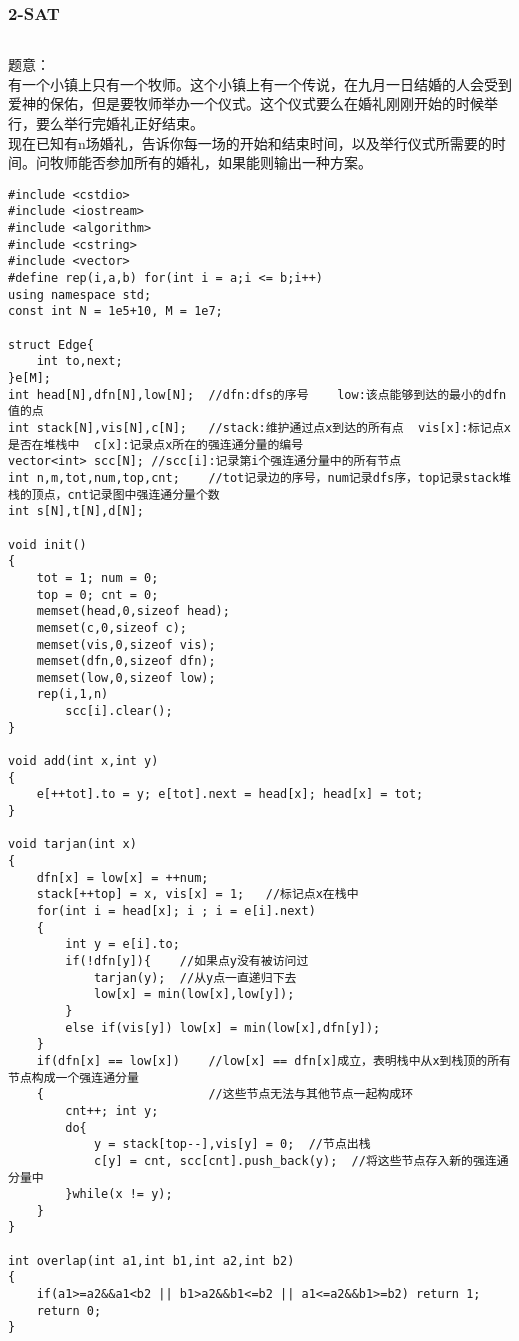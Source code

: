 \documentclass[twoside]{article}
\begin{document}
\subsubsection{2-SAT}
\begin{lstlisting}
\end{lstlisting}
题意：\\
\quad 有一个小镇上只有一个牧师。这个小镇上有一个传说，在九月一日结婚的人会受到爱神的保佑，但是要牧师举办一个仪式。这个仪式要么在婚礼刚刚开始的时候举行，要么举行完婚礼正好结束。 \\
\quad 现在已知有n场婚礼，告诉你每一场的开始和结束时间，以及举行仪式所需要的时间。问牧师能否参加所有的婚礼，如果能则输出一种方案。\\
\begin{lstlisting}
#include <cstdio>
#include <iostream>
#include <algorithm>
#include <cstring>
#include <vector>
#define rep(i,a,b) for(int i = a;i <= b;i++)
using namespace std;
const int N = 1e5+10, M = 1e7;

struct Edge{
	int to,next;
}e[M];
int head[N],dfn[N],low[N];	//dfn:dfs的序号	low:该点能够到达的最小的dfn值的点
int stack[N],vis[N],c[N];	//stack:维护通过点x到达的所有点  vis[x]:标记点x是否在堆栈中  c[x]:记录点x所在的强连通分量的编号
vector<int> scc[N];	//scc[i]:记录第i个强连通分量中的所有节点
int n,m,tot,num,top,cnt;	//tot记录边的序号，num记录dfs序，top记录stack堆栈的顶点，cnt记录图中强连通分量个数
int s[N],t[N],d[N];

void init()
{
	tot = 1; num = 0;
	top = 0; cnt = 0;
	memset(head,0,sizeof head);
	memset(c,0,sizeof c);
	memset(vis,0,sizeof vis);
	memset(dfn,0,sizeof dfn);
	memset(low,0,sizeof low);
	rep(i,1,n)
		scc[i].clear();
}

void add(int x,int y)
{
	e[++tot].to = y; e[tot].next = head[x]; head[x] = tot;
}

void tarjan(int x)
{
	dfn[x] = low[x] = ++num;
	stack[++top] = x, vis[x] = 1;	//标记点x在栈中
	for(int i = head[x]; i ; i = e[i].next)
	{
		int y = e[i].to;
		if(!dfn[y]){	//如果点y没有被访问过
			tarjan(y);	//从y点一直递归下去
			low[x] = min(low[x],low[y]);
		}
		else if(vis[y]) low[x] = min(low[x],dfn[y]);
	}
	if(dfn[x] == low[x])	//low[x] == dfn[x]成立，表明栈中从x到栈顶的所有节点构成一个强连通分量
	{						//这些节点无法与其他节点一起构成环
		cnt++; int y;
		do{
			y = stack[top--],vis[y] = 0;  //节点出栈
			c[y] = cnt, scc[cnt].push_back(y);	//将这些节点存入新的强连通分量中
		}while(x != y);
	}
}

int overlap(int a1,int b1,int a2,int b2)
{
	if(a1>=a2&&a1<b2 || b1>a2&&b1<=b2 || a1<=a2&&b1>=b2) return 1;
	return 0;
}


\end{lstlisting}
\end{document}
